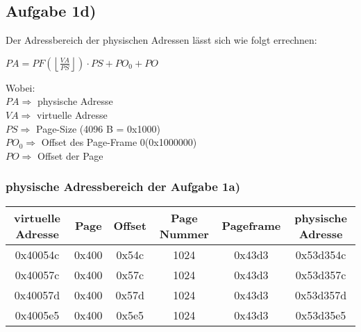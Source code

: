 \documentclass{ti2}
\begin{document}
\newpage
\subsection*{Aufgabe 1d)}
Der Adressbereich der physischen Adressen lässt sich wie folgt errechnen:
\begin{center}
	$PA=PF\left(\left\lfloor\frac{VA}{PS}\right\rfloor\right)\cdot PS + PO_0+PO$
\end{center}
Wobei:\\
$PA\Rightarrow$ physische Adresse\\
$VA\Rightarrow$ virtuelle Adresse\\
$PS\Rightarrow$ Page-Size (4096 B = 0x1000)\\
$PO_0\Rightarrow$ Offset des Page-Frame 0(0x1000000)\\
$PO\Rightarrow$ Offset der Page
\subsubsection*{physische Adressbereich der Aufgabe 1a)}
\begin{tabular}{c|c|c|c|c|c}
virtuelle Adresse 	& Page 	& Offset& Page Nummer	& Pageframe & physische Adresse 	\\ \hline
0x40054c			& 0x400	& 0x54c	& 1024 & 0x43d3 & 0x53d354c			\\ 
0x40057c			& 0x400	& 0x57c & 1024 & 0x43d3	& 0x53d357c			\\ 
0x40057d			& 0x400 & 0x57d	& 1024 & 0x43d3 & 0x53d357d			\\ 
0x4005e5			& 0x400 & 0x5e5	& 1024 & 0x43d3	& 0x53d35e5			\\ 
\end{tabular}
\end{document}
